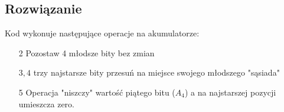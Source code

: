 \documentclass[a4paper,12pt]{extarticle}  %
\begin{document}
\subsection{Rozwiązanie}
\begin{table}[H]
\centering
{}
\end{table}

Kod wykonuje następujące operacje na akumulatorze:
\begin{itemize}
     \item[2] Pozostaw 4 młodsze bity bez zmian
     \item[$3, 4$] trzy najstarsze bity przesuń na miejsce swojego młodszego "sąsiada"
     \item[5] Operacja "niszczy" wartość piątego bitu ($A_4$) a na najstarszej pozycji umieszcza zero.
\end{itemize}

\end{document}
